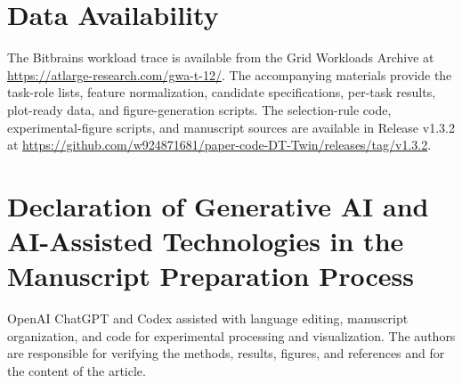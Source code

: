 \documentclass[a4paper,fleqn]{cas-sc}
\begin{document}
\section*{Data Availability}
The Bitbrains workload trace is available from the Grid Workloads Archive
at \url{https://atlarge-research.com/gwa-t-12/}. The accompanying materials
provide the task-role lists, feature normalization, candidate specifications,
per-task results, plot-ready data, and figure-generation scripts.
The selection-rule code, experimental-figure scripts, and manuscript sources
are available in Release v1.3.2 at
\url{https://github.com/w924871681/paper-code-DT-Twin/releases/tag/v1.3.2}.

\section*{Declaration of Generative AI and AI-Assisted Technologies
in the Manuscript Preparation Process}
OpenAI ChatGPT and Codex assisted with language editing, manuscript
organization, and code for experimental processing and visualization.
The authors are responsible for verifying the methods, results, figures,
and references and for the content of the article.
\end{document}
